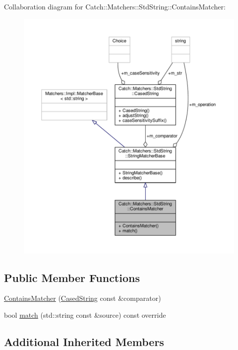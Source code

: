 Collaboration diagram for Catch\-:\-:Matchers\-:\-:Std\-String\-:\-:Contains\-Matcher\-:
\nopagebreak
\begin{figure}[H]
\begin{center}
\leavevmode
\includegraphics[width=350pt]{struct_catch_1_1_matchers_1_1_std_string_1_1_contains_matcher__coll__graph}
\end{center}
\end{figure}
\subsection*{Public Member Functions}
\begin{DoxyCompactItemize}
\item 
\hyperlink{struct_catch_1_1_matchers_1_1_std_string_1_1_contains_matcher_acc892883c8409e34b28c9b39d4ef1fe3}{Contains\-Matcher} (\hyperlink{struct_catch_1_1_matchers_1_1_std_string_1_1_cased_string}{Cased\-String} const \&comparator)
\item 
bool \hyperlink{struct_catch_1_1_matchers_1_1_std_string_1_1_contains_matcher_a630628b234b037be83fe587081a80b53}{match} (std\-::string const \&source) const override
\end{DoxyCompactItemize}
\subsection*{Additional Inherited Members}


